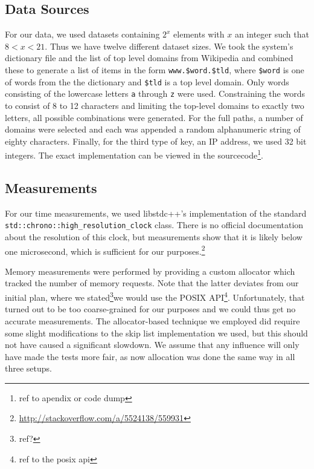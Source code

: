 \documentclass[12pt,a4paper]{article}
\begin{document}
    \subsection{Data Sources}
    For our data, we used datasets containing $2^x$ elements with $x$ an integer such that $8 < x <
    21$. Thus we have twelve different dataset sizes. We took the system's dictionary file and the
    list of top level domains from Wikipedia and combined these to generate a list of items in the
    form \texttt{www.\$word.\$tld}, where \texttt{\$word} is one of words from the the dictionary
    and \texttt{\$tld} is a top level domain.  Only words consisting of the lowercase letters
    \texttt{a} through \texttt{z} were used. Constraining the words to consist of 8 to 12 characters
    and limiting the top-level domains to exactly two letters, all possible combinations were
    generated.  For the full paths, a number of domains were selected and each was appended a random
    alphanumeric string of eighty characters.  Finally, for the third type of key, an IP address, we
    used 32 bit integers. The exact implementation can be viewed in the sourcecode\footnote{ref to
    apendix or code dump}.

    \subsection{Measurements}
    \label{subsec:measurements}
    For our time measurements, we used libstdc++'s implementation of the standard
    \texttt{std::chrono::high\_resolution\_clock} class.  There is no official documentation about
    the resolution of this clock, but measurements show that it is likely below one microsecond,
    which is sufficient for our purposes.\footnote{\url{http://stackoverflow.com/a/5524138/559931}}

    Memory measurements were performed by providing a custom allocator which tracked the number of
    memory requests.  Note that the latter deviates from our initial plan, where we
    stated\footnote{ref?}we would use the POSIX API\footnote{ref to the posix api}.  Unfortunately,
    that turned out to be too coarse-grained for our purposes and we could thus get no accurate
    measurements.  The allocator-based technique we employed did require some slight modifications
    to the skip list implementation we used, but this should not have caused a significant slowdown.
    We assume that any influence will only have made the tests more fair, as now allocation was done
    the same way in all three setups.
\end{document}
